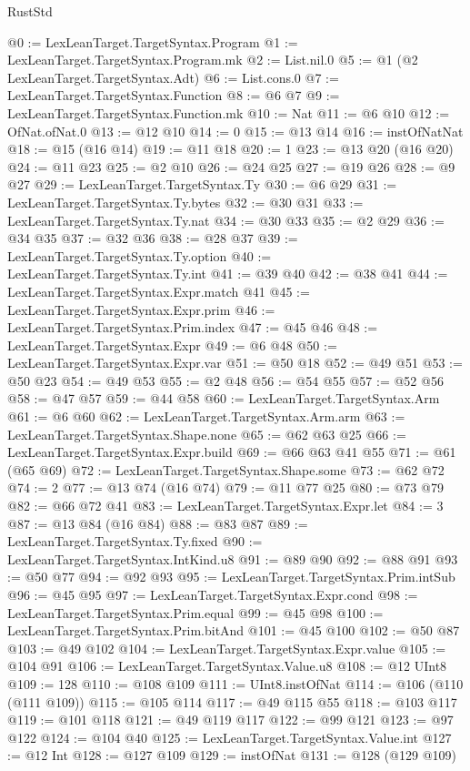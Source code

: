 \begin{lexlean}{RustStd}
\begin{coremodule}
@0 := LexLeanTarget.TargetSyntax.Program
@1 := LexLeanTarget.TargetSyntax.Program.mk
@2 := List.nil.{0}
@5 := @1 (@2 LexLeanTarget.TargetSyntax.Adt)
@6 := List.cons.{0}
@7 := LexLeanTarget.TargetSyntax.Function
@8 := @6 @7
@9 := LexLeanTarget.TargetSyntax.Function.mk
@10 := Nat
@11 := @6 @10
@12 := OfNat.ofNat.{0}
@13 := @12 @10
@14 := 0
@15 := @13 @14
@16 := instOfNatNat
@18 := @15 (@16 @14)
@19 := @11 @18
@20 := 1
@23 := @13 @20 (@16 @20)
@24 := @11 @23
@25 := @2 @10
@26 := @24 @25
@27 := @19 @26
@28 := @9 @27
@29 := LexLeanTarget.TargetSyntax.Ty
@30 := @6 @29
@31 := LexLeanTarget.TargetSyntax.Ty.bytes
@32 := @30 @31
@33 := LexLeanTarget.TargetSyntax.Ty.nat
@34 := @30 @33
@35 := @2 @29
@36 := @34 @35
@37 := @32 @36
@38 := @28 @37
@39 := LexLeanTarget.TargetSyntax.Ty.option
@40 := LexLeanTarget.TargetSyntax.Ty.int
@41 := @39 @40
@42 := @38 @41
@44 := LexLeanTarget.TargetSyntax.Expr.match @41
@45 := LexLeanTarget.TargetSyntax.Expr.prim
@46 := LexLeanTarget.TargetSyntax.Prim.index
@47 := @45 @46
@48 := LexLeanTarget.TargetSyntax.Expr
@49 := @6 @48
@50 := LexLeanTarget.TargetSyntax.Expr.var
@51 := @50 @18
@52 := @49 @51
@53 := @50 @23
@54 := @49 @53
@55 := @2 @48
@56 := @54 @55
@57 := @52 @56
@58 := @47 @57
@59 := @44 @58
@60 := LexLeanTarget.TargetSyntax.Arm
@61 := @6 @60
@62 := LexLeanTarget.TargetSyntax.Arm.arm
@63 := LexLeanTarget.TargetSyntax.Shape.none
@65 := @62 @63 @25
@66 := LexLeanTarget.TargetSyntax.Expr.build
@69 := @66 @63 @41 @55
@71 := @61 (@65 @69)
@72 := LexLeanTarget.TargetSyntax.Shape.some
@73 := @62 @72
@74 := 2
@77 := @13 @74 (@16 @74)
@79 := @11 @77 @25
@80 := @73 @79
@82 := @66 @72 @41
@83 := LexLeanTarget.TargetSyntax.Expr.let
@84 := 3
@87 := @13 @84 (@16 @84)
@88 := @83 @87
@89 := LexLeanTarget.TargetSyntax.Ty.fixed
@90 := LexLeanTarget.TargetSyntax.IntKind.u8
@91 := @89 @90
@92 := @88 @91
@93 := @50 @77
@94 := @92 @93
@95 := LexLeanTarget.TargetSyntax.Prim.intSub
@96 := @45 @95
@97 := LexLeanTarget.TargetSyntax.Expr.cond
@98 := LexLeanTarget.TargetSyntax.Prim.equal
@99 := @45 @98
@100 := LexLeanTarget.TargetSyntax.Prim.bitAnd
@101 := @45 @100
@102 := @50 @87
@103 := @49 @102
@104 := LexLeanTarget.TargetSyntax.Expr.value
@105 := @104 @91
@106 := LexLeanTarget.TargetSyntax.Value.u8
@108 := @12 UInt8
@109 := 128
@110 := @108 @109
@111 := UInt8.instOfNat
@114 := @106 (@110 (@111 @109))
@115 := @105 @114
@117 := @49 @115 @55
@118 := @103 @117
@119 := @101 @118
@121 := @49 @119 @117
@122 := @99 @121
@123 := @97 @122
@124 := @104 @40
@125 := LexLeanTarget.TargetSyntax.Value.int
@127 := @12 Int
@128 := @127 @109
@129 := instOfNat
@131 := @128 (@129 @109)

\end{coremodule}
\end{lexlean}
